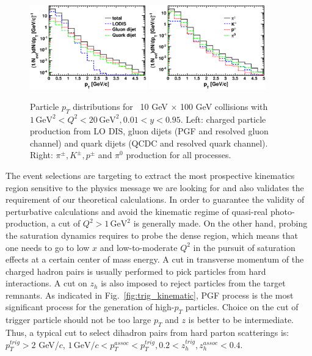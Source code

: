 \begin{figure} 
\begin{center} 
\includegraphics[width=0.45\textwidth]
{plots/chpt6/ep_10x100_Q2_1_20_y_0.01_0.95_process_ptSpectrum.eps}
\includegraphics[width=0.45\textwidth]
{plots/chpt6/ep_10x100_Q2_1_20_y_0.01_0.95_PID_ptSpectrum.eps}
\end{center} 
\caption[Process or PID dependent pt distribution]
{Particle $p_{T}$ distributions for \ep\ 10 GeV $\times$ 100 GeV collisions with
$1 \, \mathrm{GeV}^{2}  < Q^{2} < 20 \, \mathrm{GeV^{2}}, 0.01 < y < 0.95$. Left: charged particle production from LO DIS, gluon dijets
(PGF and resolved gluon channel) and quark dijets (QCDC and resolved quark channel).
Right: $\pi^{\pm}, K^{\pm}, p^{\pm}$ and $\pi^{0}$ production for all processes.}
\label{fig:PtSpectrum}
\end{figure}

The event selections are targeting to extract the most prospective kinematics
region sensitive to the physics message we are looking for and also validates
the requirement of our theoretical calculations. In order to guarantee the
validity of perturbative calculations and avoid the kinematic regime of
quasi-real photo-production, a cut of $Q^{2}>1 \, \mathrm{GeV}^{2}$ is generally
made. On the other hand, probing the saturation dynamics requires to probe the
dense region, which means that one needs to go to low $x$ and low-to-moderate
$Q^{2}$ in the pursuit of saturation effects at a certain center of mass energy.
A cut in transverse momentum of the charged hadron pairs is usually performed to
pick particles from hard interactions. A cut on $z_{h}$ is also imposed to
reject particles from the target remnants. As indicated in Fig.~\ref{fig:trig_kinematic},
PGF process is the most significant process for the generation of high-$p_{T}$ particles. 
Choice on the cut of trigger particle should not be too large $p_{T}$ and $z$ is
better to be intermediate. Thus, a typical cut to select dihadron pairs from hard parton
scatterings is: $p_{T}^{trig}>2$ GeV/$c$, $1 \, \mathrm{GeV/}c
<p_{T}^{assoc}<p_{T}^{trig}, 0.2<z_{h}^{trig},z_{h}^{assoc}<0.4$.

